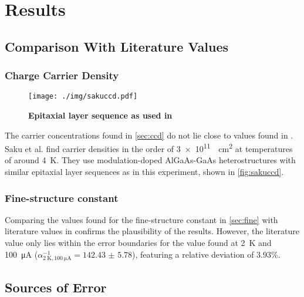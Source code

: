 \chapter{Results}

\section{Comparison With Literature Values} %
\subsection{Charge Carrier Density}
\begin{figure}
	\centering
	\texttt{[image: ./img/sakuccd.pdf]}
	\caption[Epitaxial layer sequence comparison]{\textbf{Epitaxial layer sequence as used in \cite{ccd}}}
	\label{fig:sakuccd}
\end{figure}
The carrier concentrations found in \autoref{sec:ccd} do not lie close to values found in \cite{ccd}.
Saku et al. find carrier densities in the order of \SI{3e11}{\per\centi\meter\squared} at temperatures of around \SI{4}{\kelvin}.
They use modulation-doped AlGaAs-GaAs heterostructures with similar epitaxial layer sequences as in this experiment, shown in \autoref{fig:sakuccd}.

\subsection{Fine-structure constant}
Comparing the values found for the fine-structure constant in \autoref{sec:fine} with literature values in \cite{NIST} confirms the plausibility of the results.
However, the literature value only lies within the error boundaries for the value found at \SI{2}{\kelvin} and \SI{100}{\micro\ampere} ($\alpha^{-1}_{\SI{2}{\kelvin},\SI{100}{\micro\ampere}} = \num{142.43(578)}$), featuring a relative deviation of \num{3.93}\%.

\section{Sources of Error} %
